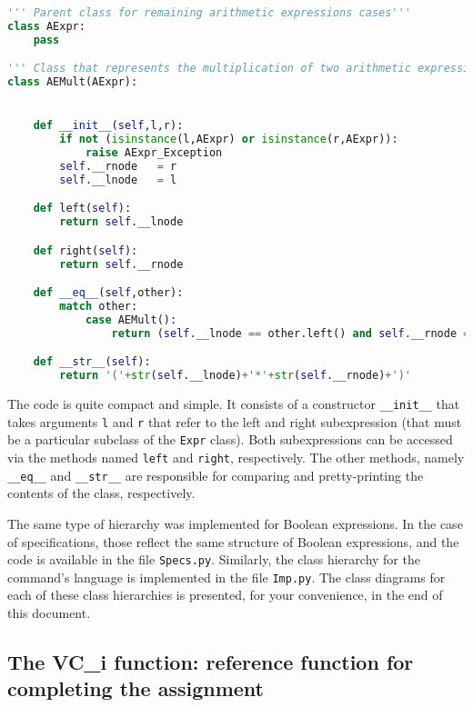 \documentclass[11pt]{article}
\begin{document}
\begin{lstlisting}[language=Python]
''' Parent class for remaining arithmetic expressions cases'''
class AExpr:
    pass

''' Class that represents the multiplication of two arithmetic expressions.'''
class AEMult(AExpr):


    def __init__(self,l,r):
        if not (isinstance(l,AExpr) or isinstance(r,AExpr)):
            raise AExpr_Exception
        self.__rnode   = r
        self.__lnode   = l

    def left(self):
        return self.__lnode

    def right(self):
        return self.__rnode

    def __eq__(self,other):
        match other:
            case AEMult():
                return (self.__lnode == other.left() and self.__rnode == other.right())

    def __str__(self):
        return '('+str(self.__lnode)+'*'+str(self.__rnode)+')'  
\end{lstlisting}
The code is quite compact and simple. It consists of a constructor \lstinline!__init__! that takes arguments \lstinline!l! and \lstinline!r! that refer to the left and right subexpression (that must be a particular subclass of the \lstinline!Expr! class). Both subexpressions can be accessed via the methods named \lstinline!left! and \lstinline!right!, respectively. The other methods, namely \lstinline!__eq__! and \lstinline!__str__! are responsible for comparing and pretty-printing the contents of the class, respectively.


The same type of hierarchy was implemented for Boolean expressions. In the case of specifications, those reflect the same structure of Boolean expressions, and the code is available in the file \texttt{Specs.py}. Similarly, the class hierarchy for the command's language is implemented in the file \texttt{Imp.py}. The class diagrams for each of these class hierarchies is presented, for your convenience, in the end of this document.

\subsection{The VC\_i function: reference function for completing the assignment}
\end{document}
